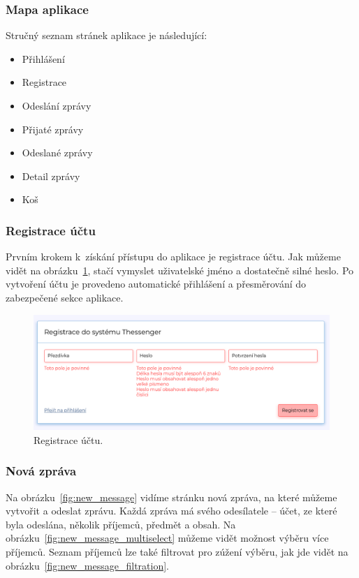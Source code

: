 \documentclass[
  master,
  program=ainf,
  printversion,
  tables=false,
  sourcecodes,
  glossaries,
  index
]{kidiplom}
\begin{document}
\subsubsection{Mapa aplikace}
Stručný seznam stránek aplikace je následující:
\begin{itemize}
  \item Přihlášení
  \item Registrace
  \item Odeslání zprávy
  \item Přijaté zprávy
  \item Odeslané zprávy
  \item Detail zprávy
  \item Koš
\end{itemize}

\subsubsection{Registrace účtu}
Prvním krokem k~získání přístupu do aplikace je registrace účtu. Jak můžeme vidět
na obrázku~\ref{fig:registration}, stačí vymyslet
uživatelské jméno a dostatečně silné heslo. Po vytvoření účtu je provedeno
automatické přihlášení a přesměrování do zabezpečené sekce aplikace.

\begin{figure}[H]
  \centering
  \includegraphics[width=\textwidth]{graphics/thessenger_registration.png}
  \caption{Registrace účtu.}
  \label{fig:registration}
\end{figure}

\subsubsection{Nová zpráva}
Na obrázku~\ref{fig:new_message} vidíme stránku nová zpráva, na které můžeme vytvořit a odeslat zprávu.
Každá zpráva má svého odesílatele -- účet, ze které byla odeslána, několik
příjemců, předmět a obsah. 
Na obrázku~\ref{fig:new_message_multiselect} můžeme vidět možnost výběru
více příjemců. Seznam příjemců lze také filtrovat pro zúžení výběru, jak jde vidět na
obrázku~\ref{fig:new_message_filtration}.
\end{document}
